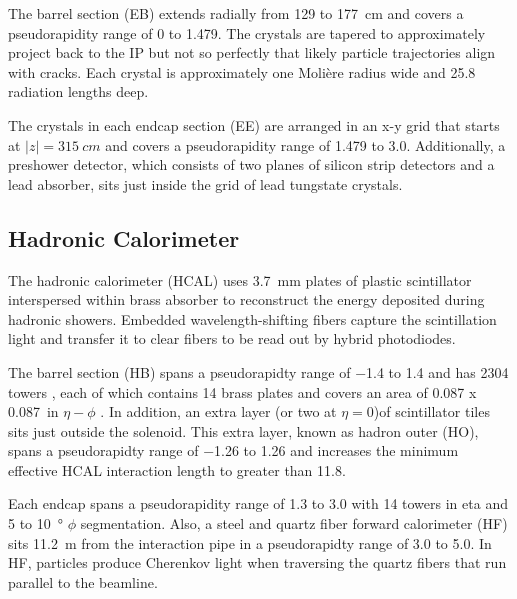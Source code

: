 \documentclass[12pt]{article}
\begin{document}
        The barrel section (EB) extends radially from \num{129} to \SI{177}{cm} and covers a pseudorapidity range of \num{0} to \num{1.479}. The crystals are tapered to approximately project back to the IP but not so perfectly that likely particle trajectories align with cracks. Each crystal is approximately one Moli\`ere radius wide and 25.8 radiation lengths deep.

        The crystals in each endcap section (EE) are arranged in an x-y grid that starts at $\lvert z \rvert = \SI{315}{cm}$ and covers a pseudorapidity range of \num{1.479} to \num{3.0}. Additionally, a preshower detector, which consists of two planes of silicon strip detectors and a lead absorber, sits just inside the grid of lead tungstate crystals. 

    \subsection{Hadronic Calorimeter}
        The hadronic calorimeter (HCAL) uses \SI{3.7}{mm} plates of plastic scintillator interspersed within brass absorber to reconstruct the energy deposited during hadronic showers. Embedded wavelength-shifting fibers capture the scintillation light and transfer it to clear fibers to be read out by hybrid photodiodes.

        The barrel section (HB) spans a pseudorapidty range of \num{-1.4} to \num{1.4} and has \num{2304} towers , each of which contains \num{14}  brass plates and covers an area of \num{0.087} x \SI{0.087}{in} $\eta-\phi$ . In addition, an extra layer (or two at $\eta = \num{0}$)of scintillator tiles sits just outside the solenoid. This extra layer, known as hadron outer (HO), spans a pseudorapidty range of \num{-1.26} to \num{1.26} and increases the minimum effective HCAL interaction length to greater than \num{11.8}.

        Each endcap spans a pseudorapidity range of \num{1.3} to \num{3.0} with \num{14} towers in eta and \num{5} to \SI{10}{\degree} $\phi$ segmentation. Also, a steel and quartz fiber forward calorimeter (HF) sits \SI{11.2}{m} from the interaction pipe in a pseudorapidty range of \num{3.0} to \num{5.0}. In HF, particles produce Cherenkov light when traversing the quartz fibers that run parallel to the beamline. 
\end{document}
